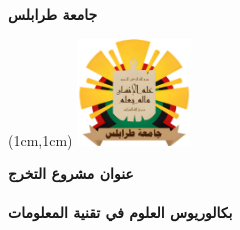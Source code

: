 \documentclass[a4paper,12pt]{book}
\begin{document}
	\color{black}
	
	\begin{titlepage}
		\begin{flushright}
			\fontsize{24}{24}\selectfont\textbf{\textarabic{جامعة طرابلس}}\\[10pt]
		\end{flushright}
		\hfill    
		\begin{textblock*}{3cm}(1cm,1cm)
			\includegraphics[width=3cm]{UOT_logo_transp.png}
		\end{textblock*}
		\vfill
		\begin{center}
			\fontsize{24}{24}\selectfont\textbf{\textarabic{عنوان مشروع التخرج}}\\[20pt]
			\fontsize{14}{14}\\[10pt]
			\vfill
			\fontsize{20}{20}\selectfont\textbf{\textarabic{بكالوريوس العلوم في تقنية المعلومات}}\\[10pt]
			\fontsize{14}{14}\\
		\end{center}
	\end{titlepage}
	
\end{document}
